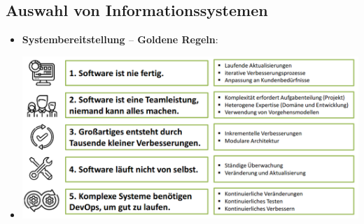 \documentclass[12pt,a4paper]{article}
\begin{document}
\subsection{Auswahl von Informationssystemen} %
\begin{itemize}
   \item \textbf{Systembereitstellung $–$ Goldene Regeln}:
   \item[] \includegraphics[scale=0.52]{GoldeneRegeln.png}
   

\end{itemize}
\end{document}
